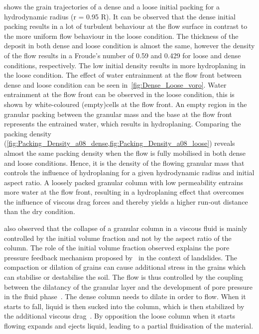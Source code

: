 shows the grain trajectories of a dense and a loose 
initial packing for a hydrodynamic radius (r = 0.95 R). It can be observed that 
the dense initial packing results in a lot of turbulent behaviour at the flow 
surface in contrast to the more uniform flow behaviour in the loose condition. 
The thickness of the deposit in both dense and loose condition is almost the 
same, however the density of the flow results in a Froude's number of 0.59 and
0.429 for loose and dense conditions, respectively. The low initial density 
results in more hydroplaning in the loose condition. The effect of water 
entrainment at the flow front between dense and loose condition can be seen 
in~\cref{fig:Dense_Loose_voro}. Water entrainment at the flow front can be 
observed in the loose condition, this is shown by white-coloured (empty)cells 
at the flow front. An empty region in the granular packing between the granular 
mass and the base at the flow front represents the entrained water, which 
results in hydroplaning. Comparing the packing density 
(\cref{fig:Packing_Density_a08_dense,fig:Packing_Density_a08_loose}) 
reveals almost the same packing density when the flow is fully mobilised in 
both dense and loose conditions. Hence, it is the density of the flowing 
granular mass that controls the influence of hydroplaning for a given 
hydrodynamic radius and initial aspect ratio. A loosely packed granular column 
with low permeability entrains 
more water at the flow front, resulting in a hydroplaning effect that overcomes 
the influence of viscous drag forces and thereby yields a higher run-out 
distance than the dry condition.

\citet{Rondon2011} also observed that the collapse of a granular column in a 
viscous fluid is mainly controlled by the initial volume fraction and not by 
the aspect ratio of the column. The role of the initial volume fraction 
observed explains the pore pressure feedback mechanism proposed 
by~\citep{Schaeffer2008,Iverson2000} in the context of landslides. The 
compaction or dilation of grains can cause additional stress in the grains 
which can stabilise or destabilise the soil. The flow is thus controlled by the 
coupling between the dilatancy of the granular layer and the development of 
pore pressure in the fluid phase~\citep{Pailha2008}. The dense column needs to 
dilate in order to flow. When it starts to fall, liquid is then sucked into the 
column, which is then stabilized by the additional viscous 
drag~\citep{Rondon2011,Topin2012}. By opposition the loose column when 
it starts flowing expands and ejects liquid, leading to a partial fluidisation 
of the material.

